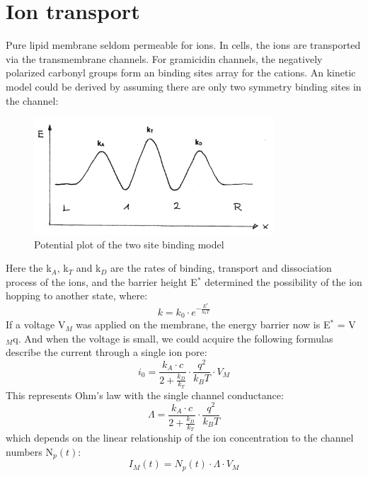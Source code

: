 \documentclass[a4paper,english,12pt,bibliography=totoc]{scrreprt}
\begin{document}
\section{Ion transport}
Pure lipid membrane seldom permeable for ions. In cells, the ions are transported via the transmembrane channels. For gramicidin channels, the negatively polarized carbonyl groups form an binding sites array for the cations. An kinetic model could be derived by assuming there are only two symmetry binding sites in the channel:
\begin{figure}[H]
\centering
\includegraphics[width = 0.8\textwidth]{Group 8/potential barrier.png}
\caption{Potential plot of the two site binding model}
\end{figure}
Here the k$_A$, k$_T$ and k$_D$ are the rates of binding, transport and dissociation process of the ions, and the barrier height E$^*$ determined the possibility of the ion hopping to another state, where:
\begin{equation}
k = k_0 \cdot e^{-\frac{E^*}{k_bT}}
\end{equation}
If a voltage V$_M$ was applied on the membrane, the energy barrier now is E$^*$ =  V$_M$q. And when the voltage is small, we could acquire the following formulas describe the current through a single ion pore:
\begin{equation}
i_0 = \frac{k_A\cdot c}{2+\frac{k_D}{k_T}}\cdot \frac{q^2}{k_BT}\cdot V_M
\end {equation}
This represents Ohm's law with the single channel conductance:
\begin{equation}
\Lambda = \frac{k_A\cdot c}{2+\frac{k_D}{k_T}}\cdot \frac{q^2}{k_BT}
\end{equation}
which depends on the linear relationship of the ion concentration to the channel numbers N$_p(t)$:
\begin{equation}
I_M(t) = N_p(t)\cdot \Lambda \cdot V_M
\end{equation}
\end{document}
